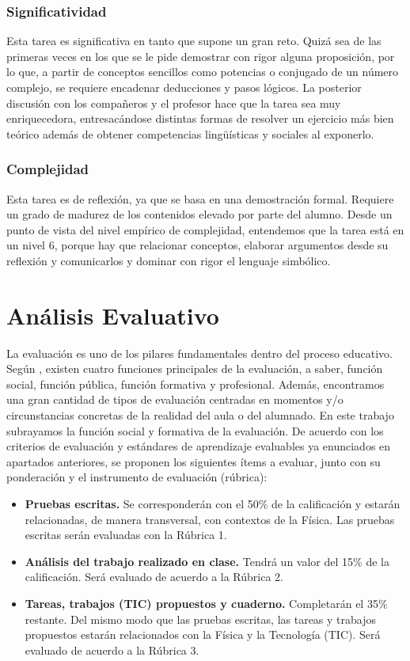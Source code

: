 \documentclass[../main.tex]{memoir}
\begin{document}
\subsubsection{Significatividad}
Esta tarea es significativa en tanto que supone un gran reto. Quizá sea de las primeras veces en los que se le pide demostrar con rigor alguna proposición, por lo que, a partir de conceptos sencillos como potencias o conjugado de un número complejo, se requiere encadenar deducciones y pasos lógicos. La posterior discusión con los compañeros y el profesor hace que la tarea sea muy enriquecedora, entresacándose distintas formas de resolver un ejercicio más bien teórico además de obtener competencias lingüísticas y sociales al exponerlo.

\subsubsection{Complejidad}
Esta tarea es de reflexión, ya que se basa en una demostración formal. Requiere un grado de madurez de los contenidos elevado por parte del alumno. Desde un punto de vista del nivel empírico de complejidad, entendemos que la tarea está en un nivel 6, porque hay que relacionar conceptos, elaborar argumentos desde su reflexión y comunicarlos y dominar con rigor el lenguaje simbólico. 


\section{Análisis Evaluativo}

La evaluación es uno de los pilares fundamentales dentro del proceso educativo. Según \cite{rico2013}, existen cuatro funciones principales de la evaluación, a saber, función social, función pública, función formativa y profesional. Además, encontramos una gran cantidad de tipos de evaluación centradas en momentos y/o circunstancias concretas de la realidad del aula o del alumnado. En este trabajo subrayamos la función social y formativa de la evaluación. De acuerdo con los criterios de evaluación y estándares de aprendizaje evaluables ya enunciados en apartados anteriores, se proponen los siguientes ítems a evaluar, junto con su ponderación y el instrumento de evaluación (rúbrica):

\begin{itemize}
	\item \textbf{Pruebas escritas.} Se corresponderán con el 50\% de la calificación y estarán relacionadas, de manera transversal, con contextos de la Física. Las pruebas escritas serán evaluadas con la Rúbrica 1.
	\item \textbf{Análisis del trabajo realizado en clase.} Tendrá un valor del 15\% de la calificación. Será evaluado de acuerdo a la Rúbrica 2.
	\item \textbf{Tareas, trabajos (TIC) propuestos y cuaderno.} Completarán el 35\% restante. Del mismo modo que las pruebas escritas, las tareas y trabajos propuestos estarán relacionados con la Física y la Tecnología (TIC).  Será evaluado de acuerdo a la Rúbrica 3.
\end{itemize}
\end{document}

